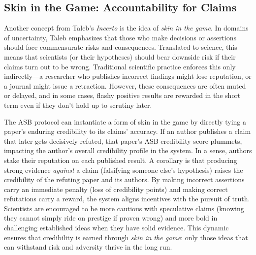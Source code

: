 \documentclass{article}
\begin{document}
\subsection{Skin in the Game: Accountability for Claims}
Another concept from Taleb's \emph{Incerto} is the idea of \emph{skin in the game}\cite{Taleb2018}. In domains of uncertainty, Taleb emphasizes that those who make decisions or assertions should face commensurate risks and consequences. Translated to science, this means that scientists (or their hypotheses) should bear downside risk if their claims turn out to be wrong. Traditional scientific practice enforces this only indirectly---a researcher who publishes incorrect findings might lose reputation, or a journal might issue a retraction. However, these consequences are often muted or delayed, and in some cases, flashy positive results are rewarded in the short term even if they don't hold up to scrutiny later.

The ASB protocol can instantiate a form of skin in the game by directly tying a paper's enduring credibility to its claims' accuracy. If an author publishes a claim that later gets decisively refuted, that paper's ASB credibility score plummets, impacting the author's overall credibility profile in the system. In a sense, authors stake their reputation on each published result. A corollary is that producing strong evidence \emph{against} a claim (falsifying someone else's hypothesis) raises the credibility of the refuting paper and its authors. By making incorrect assertions carry an immediate penalty (loss of credibility points) and making correct refutations carry a reward, the system aligns incentives with the pursuit of truth. Scientists are encouraged to be more cautious with speculative claims (knowing they cannot simply ride on prestige if proven wrong) and more bold in challenging established ideas when they have solid evidence. This dynamic ensures that credibility is earned through \emph{skin in the game}: only those ideas that can withstand risk and adversity thrive in the long run.
\end{document}

